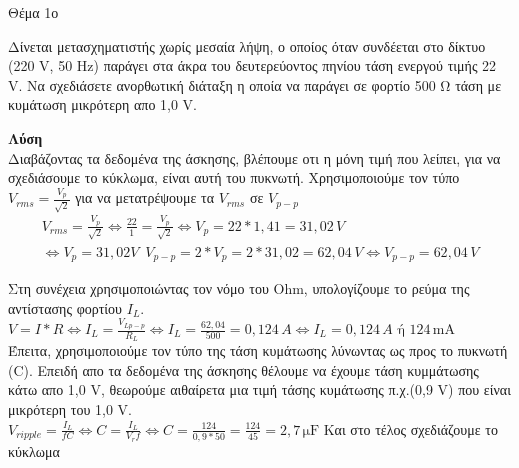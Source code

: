 \documentclass[12pt,a4paper,oneside]{book}
\begin{document}
\indent Θέμα 1ο \par
\indent Δίνεται μετασχηματιστής χωρίς μεσαία λήψη, ο οποίος όταν συνδέεται στο δίκτυο (220 V, 50 Hz) παράγει στα άκρα του δευτερεύοντος πηνίου τάση ενεργού τιμής 22 V. Να σχεδιάσετε ανορθωτική διάταξη η οποία να παράγει σε φορτίο 500 Ω τάση με κυμάτωση μικρότερη απο 1,0 V.
\par \textbf{Λύση}\\
Διαβάζοντας τα δεδομένα της άσκησης, βλέπουμε οτι η μόνη τιμή που λείπει, για να σχεδιάσουμε το κύκλωμα, είναι αυτή του πυκνωτή.
 Χρησιμοποιούμε τον τύπο {\sloppy ${ V_{rms} = \frac{V_p}{\sqrt{2}} }$  για να μετατρέψουμε τα $V_{rms}$ σε $V_{p-p}$}
\begin{gather*}
   \label{eq:someequation} V_{rms} = \frac{V_p}{\sqrt{2}}
   \Longleftrightarrow \frac{22}{1} = \frac{V_p}{\sqrt{2}} \Longleftrightarrow V_p = 22*1,41 = 31,02 \,V
   \\\Longleftrightarrow V_p=31,02 V \,\,\,V_{p-p}= 2 * V_p = 2 *31,02 = 62,04 \,V \Longleftrightarrow
   V_{p-p} = 62,04 \,V
\end{gather*}
\par Στη συνέχεια χρησιμοποιώντας τον νόμο του Ohm, υπολογίζουμε το ρεύμα της αντίστασης φορτίου $I_L$.\\
{\sloppy ${V=I*R\Longleftrightarrow I_L = \frac{V_{Lp-p}}{R_L} \Longleftrightarrow I_L = \frac{62,04}{500} = 0,124 \,A
\Longleftrightarrow I_L= 0,124 \, A \,\, \text{ή} \,\, 124 \,\text{mA}}$}\\
\indent Έπειτα, χρησιμοποιούμε τον τύπο της τάση κυμάτωσης λύνωντας ως προς το πυκνωτή (C). Επειδή απο τα δεδομένα της άσκησης θέλουμε να έχουμε τάση κυμμάτωσης κάτω απο 1,0 V, θεωρούμε αιθαίρετα μια τιμή τάσης κυμάτωσης π.χ.(0,9 V) που είναι μικρότερη του 1,0 V.\\
{\sloppy ${V_{ripple} = \frac{I_L}{fC} \Longleftrightarrow C = \frac{I_L}{V_rf} \Longleftrightarrow C = \frac{124}{0,9*50} = \frac{124}{45} = 2,7 \,\text{μF} }$ }
\clearpage\indent Και στο τέλος σχεδιάζουμε το κύκλωμα\\
\end{document}

